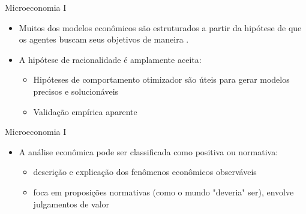 \documentclass[10pt]{beamer}
\begin{document}
\begin{frame}{Microeconomia I}
    \begin{itemize}
        \item Muitos dos modelos econômicos são estruturados a partir da hipótese de que os agentes buscam seus objetivos de maneira .\bigskip
        \bigskip
        \item A hipótese de racionalidade é amplamente aceita: \medskip
        \begin{itemize}
            \item Hipóteses de comportamento otimizador são úteis para gerar modelos precisos e solucionáveis \medskip
            \item Validação empírica aparente
        \end{itemize}
    \end{itemize}
\end{frame}

\begin{frame}{Microeconomia I}
    \begin{itemize}
        \item A análise econômica pode ser classificada como positiva ou normativa: \bigskip
        \begin{itemize}
            \item {} descrição e explicação dos fenômenos econômicos observáveis \medskip
            \item {} foca em proposições normativas (como o mundo "deveria" ser), envolve julgamentos de valor
        \end{itemize}
    \end{itemize}
\end{frame}
\end{document}
